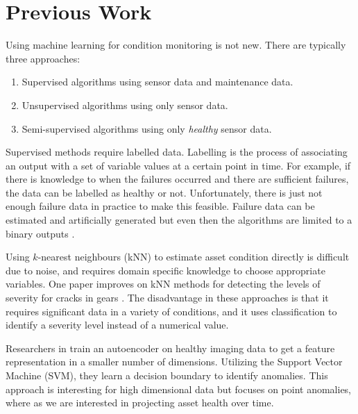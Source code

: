 \section{Previous Work}

Using machine learning for condition monitoring is not new.
There are typically three approaches:
\begin{enumerate}
	\item Supervised algorithms using sensor data and maintenance data.
    \item Unsupervised algorithms using only sensor data.
    \item Semi-supervised algorithms using only \textit{healthy} sensor data.
\end{enumerate}

Supervised methods require labelled data.
Labelling is the process of associating an output with a set of variable values at a certain point in time.
For example, if there is knowledge to when the failures occurred and there are sufficient failures, the data can be labelled as healthy or not.
Unfortunately, there is just not enough failure data in practice to make this feasible.
Failure data can be estimated and artificially generated but even then the algorithms are limited to a binary outputs \cite{Sotiris2010AnomalyDT}.

Using $k$-nearest neighbours (kNN) to estimate asset condition directly is difficult due to noise, and requires domain specific knowledge to choose appropriate variables.
One paper improves on kNN methods for detecting the levels of severity for cracks in gears \cite{lei2009gear}.
The disadvantage in these approaches is that it requires significant data in a variety of conditions, and it uses classification to identify a severity level instead of a numerical value.

Researchers in \cite{opt} train an autoencoder on healthy imaging data to get a feature representation in a smaller number of dimensions.
Utilizing the Support Vector Machine (SVM), they learn a decision boundary to identify anomalies.
This approach is interesting for high dimensional data but focuses on point anomalies, where as we are interested in projecting asset health over time.

